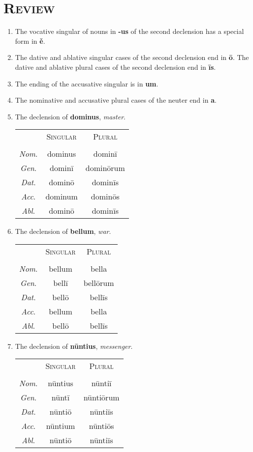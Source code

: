 \documentclass[12pt]{article}
\begin{document}
\section{\textsc{Review}}
\begin{enumerate}[1.]
	\item The vocative singular of nouns in \textbf{-us} of the second declension has a special form in \textbf{ě}.
	\item The dative and ablative singular cases of the second declension end in \textbf{ō}. The dative and ablative plural cases of the second declension end in \textbf{īs}.
	\item The ending of the accusative singular is in \textbf{um}.
	\item The nominative and accusative plural cases of the neuter end in \textbf{a}.
	\item The declension of \textbf{dominus}, \textit{master}.
	\begin{center}
		\begin{tabular}{ c c c }
		& \textsc{Singular} & \textsc{Plural} \\
		& & \\
		\textit{Nom}. & dominus & dominī \\
		\textit{Gen}. & dominī & dominōrum \\
		\textit{Dat}. & dominō & dominīs \\
		\textit{Acc}. & dominum & dominōs \\
		\textit{Abl}. & dominō & dominīs
		\end{tabular}
	\end{center}
	\item The declension of \textbf{bellum}, \textit{war}.
	\begin{center}
		\begin{tabular}{ c c c }
		& \textsc{Singular} & \textsc{Plural} \\
		& & \\
		\textit{Nom}. & bellum & bella \\
		\textit{Gen}. & bellī & bellōrum \\
		\textit{Dat}. & bellō & bellīs \\
		\textit{Acc}. & bellum & bella \\
		\textit{Abl}. & bellō & bellīs
		\end{tabular}
	\end{center}
	\item The declension of \textbf{nūntius}, \textit{messenger}.
		\begin{center}
		\begin{tabular}{ c c c }
		& \textsc{Singular} & \textsc{Plural} \\
		& & \\
		\textit{Nom}. & nūntius & nūntiī \\
		\textit{Gen}. & nūntī & nūntiōrum \\
		\textit{Dat}. & nūntiō & nūntiīs \\
		\textit{Acc}. & nūntium & nūntiōs \\
		\textit{Abl}. & nūntiō & nūntiīs
		\end{tabular}
	\end{center}
\end{enumerate}
\end{document}
